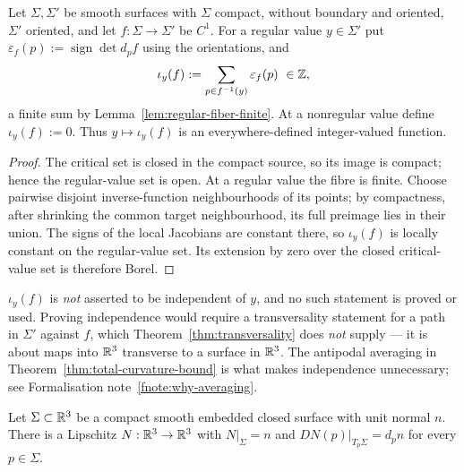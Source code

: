 \begin{definition}\label{def:index-sum}
Let $\Sigma,\Sigma'$ be smooth surfaces with $\Sigma$ compact, without
boundary and oriented, $\Sigma'$ oriented, and let $f:\Sigma\to\Sigma'$ be
$C^1$.  For a regular value $y\in\Sigma'$ put
$\varepsilon_f(p):=\operatorname{sign}\det d_pf$ using the orientations, and
\begin{equation}\label{eq:index-sum}
  \iota_y(f):=\sum_{p\in f^{-1}(y)}\varepsilon_f(p)\ \in\mathbb Z ,
\end{equation}
a finite sum by Lemma~\ref{lem:regular-fiber-finite}.  At a nonregular value
define $\iota_y(f):=0$.  Thus $y\mapsto\iota_y(f)$ is an everywhere-defined
integer-valued function.
\end{definition}

\begin{proof}
The critical set is closed in the compact source, so its image is compact;
hence the regular-value set is open.  At a regular value the fibre is finite.
Choose pairwise disjoint inverse-function neighbourhoods of its points; by
compactness, after shrinking the common target neighbourhood, its full
preimage lies in their union.  The signs of the local Jacobians are constant
there, so $\iota_y(f)$ is locally constant on the regular-value set.  Its
extension by zero over the closed critical-value set is therefore Borel.
\end{proof}

\begin{fnote}\label{fnote:not-a-degree}
$\iota_y(f)$ is \emph{not} asserted to be independent of $y$, and no such
statement is proved or used.  Proving independence would require a
transversality statement for a path in $\Sigma'$ against $f$, which
Theorem~\ref{thm:transversality} does \emph{not} supply --- it is about maps
into $\mathbb R^3$ transverse to a surface in $\mathbb R^3$.  The antipodal averaging in
Theorem~\ref{thm:total-curvature-bound} is what makes independence
unnecessary; see Formalisation note~\ref{fnote:why-averaging}.
\end{fnote}

\begin{lemma}\label{lem:gauss-map-extension}
Let $\Sigma\subset\mathbb R^3$ be a compact smooth embedded closed surface with unit
normal $n$.  There is a Lipschitz $N:\mathbb R^3\to\mathbb R^3$ with $N|_\Sigma=n$ and
$D N(p)|_{T_p\Sigma}=d_pn$ for every $p\in\Sigma$.
\end{lemma}

